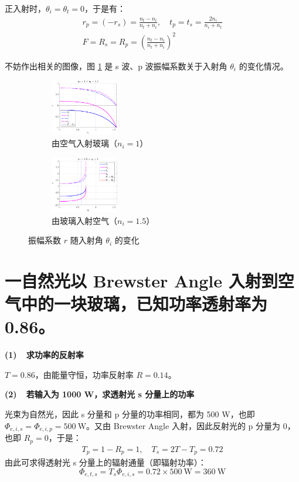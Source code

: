 \documentclass[a4paper]{article}  %
\theoremstyle{MyLineTheoremStyle} %
\theoremstyle{MyBlockTheoremStyle} %
\theoremstyle{MySubsubsectionStyle} %
\begin{document}
\begin{multicols*}{4}
正入射时，$\theta_i = \theta_t = 0$，于是有：
\begin{gather}
    r_p = (-r_s)  = \frac{n_t - n_i}{n_t + n_i},\quad t_p = t_s = \frac{2n_i}{n_i + n_t} \\ 
    F = R_s = R_p = \left( \frac{n_t - n_i}{n_t + n_i} \right)^2
\end{gather}


不妨作出相关的图像，图 \ref{振幅系数随入射角的变化} 是 s 波、p 波振幅系数关于入射角 $\theta_i$ 的变化情况。

\begin{figure}[H]\centering
\begin{subfigure}[t]{0.49\columnwidth}\centering
\includegraphics[height=70pt]{assets/2024-09-15_10-53-31.pdf}
    \caption{ 由空气入射玻璃（$n_i = 1$） }
\end{subfigure}
\begin{subfigure}[t]{0.49\columnwidth}\centering
\includegraphics[height=70pt]{assets/2024-09-15_10-53-27.pdf}
    \caption{ 由玻璃入射空气（$n_i = 1.5$） }
\end{subfigure}
\caption{ 振幅系数 $r$ 随入射角 $\theta_i$ 的变化 }\label{振幅系数随入射角的变化}
\end{figure}

\section{一自然光以 Brewster Angle 入射到空气中的一块玻璃，已知功率透射率为 0.86。}


\textbf{(1)\ \ 求功率的反射率}

$T = 0.86$，由能量守恒，功率反射率 $R = 0.14$。

\textbf{(2)\ \ 若输入为 1000 W，求透射光 s 分量上的功率}

光束为自然光，因此 s 分量和 p 分量的功率相同，都为 500 W，也即 $\Phi_{e,i,s} = \Phi_{e,i,p} = 500 \ \mathrm{W}$。又由 Brewster Angle 入射，因此反射光的 p 分量为 0，也即 $R_p = 0$，于是：
\begin{gather}
T_p = 1 - R_p = 1,\quad T_s = 2T - T_p = 0.72 
\end{gather}
由此可求得透射光 s 分量上的辐射通量（即辐射功率）：
\begin{equation}
\Phi_{e,t,s} = T_s \Phi_{e,i,s} = 0.72 \times 500 \ \mathrm{W} =  360 \ \mathrm{W}
\end{equation}


\end{multicols*}
\end{document}
